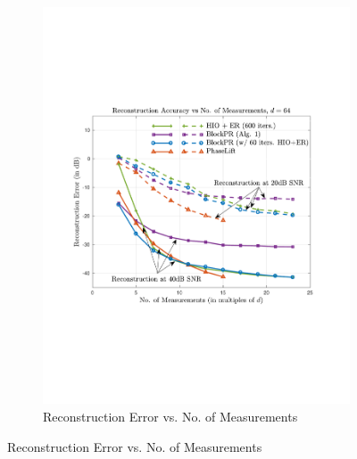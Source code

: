 %
\begin{figure}[hbtp]
\centering
\begin{subfigure}[b]{0.8\textwidth}
\centering
\includegraphics[clip=true, trim = 0.5in 2.5in 0.75in 2.5in,scale=0.55]{pics/fig5a}
\caption{Reconstruction Error vs. No. of Measurements}
\label{fig:measurements}
\end{subfigure}


\end{figure}
